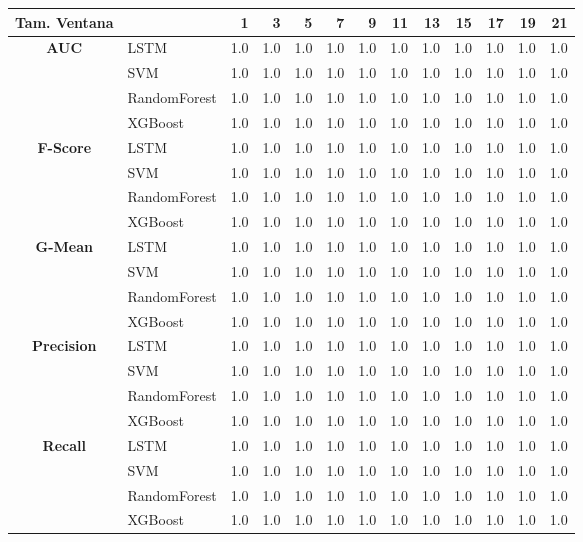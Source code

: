 \begin{table}[h]
	\centering
	\begin{adjustbox}{max width=11cm}
		
		\begin{tabular}{|c|l|r|r|r|r|r|r|r|r|r|r|r|}
			\hline
			\textbf{Tam. Ventana}&         &   1  &   3  &   5  &   7  &   9  &   11 &   13 &   15 &   17 &   19 &   21 \\
			\hline
			\textbf{AUC} & LSTM &  1.0 &  1.0 &  1.0 &  1.0 &  1.0 &  1.0 &  1.0 &  1.0 &  1.0 &  1.0 &  1.0 \\
			& SVM &  1.0 &  1.0 &  1.0 &  1.0 &  1.0 &  1.0 &  1.0 &  1.0 &  1.0 &  1.0 &  1.0 \\
			& RandomForest &  1.0 &  1.0 &  1.0 &  1.0 &  1.0 &  1.0 &  1.0 &  1.0 &  1.0 &  1.0 &  1.0 \\
			& XGBoost &  1.0 &  1.0 &  1.0 &  1.0 &  1.0 &  1.0 &  1.0 &  1.0 &  1.0 &  1.0 &  1.0 \\
			\hline
			\textbf{F-Score} & LSTM &  1.0 &  1.0 &  1.0 &  1.0 &  1.0 &  1.0 &  1.0 &  1.0 &  1.0 &  1.0 &  1.0 \\
			& SVM &  1.0 &  1.0 &  1.0 &  1.0 &  1.0 &  1.0 &  1.0 &  1.0 &  1.0 &  1.0 &  1.0 \\
			& RandomForest &  1.0 &  1.0 &  1.0 &  1.0 &  1.0 &  1.0 &  1.0 &  1.0 &  1.0 &  1.0 &  1.0 \\
			& XGBoost &  1.0 &  1.0 &  1.0 &  1.0 &  1.0 &  1.0 &  1.0 &  1.0 &  1.0 &  1.0 &  1.0 \\
			\hline
			\textbf{G-Mean} & LSTM &  1.0 &  1.0 &  1.0 &  1.0 &  1.0 &  1.0 &  1.0 &  1.0 &  1.0 &  1.0 &  1.0 \\
			& SVM &  1.0 &  1.0 &  1.0 &  1.0 &  1.0 &  1.0 &  1.0 &  1.0 &  1.0 &  1.0 &  1.0 \\
			& RandomForest &  1.0 &  1.0 &  1.0 &  1.0 &  1.0 &  1.0 &  1.0 &  1.0 &  1.0 &  1.0 &  1.0 \\
			& XGBoost &  1.0 &  1.0 &  1.0 &  1.0 &  1.0 &  1.0 &  1.0 &  1.0 &  1.0 &  1.0 &  1.0 \\
			\hline
			\textbf{Precision} & LSTM &  1.0 &  1.0 &  1.0 &  1.0 &  1.0 &  1.0 &  1.0 &  1.0 &  1.0 &  1.0 &  1.0 \\
			& SVM &  1.0 &  1.0 &  1.0 &  1.0 &  1.0 &  1.0 &  1.0 &  1.0 &  1.0 &  1.0 &  1.0 \\
			& RandomForest &  1.0 &  1.0 &  1.0 &  1.0 &  1.0 &  1.0 &  1.0 &  1.0 &  1.0 &  1.0 &  1.0 \\
			& XGBoost &  1.0 &  1.0 &  1.0 &  1.0 &  1.0 &  1.0 &  1.0 &  1.0 &  1.0 &  1.0 &  1.0 \\
			\hline
			\textbf{Recall} & LSTM &  1.0 &  1.0 &  1.0 &  1.0 &  1.0 &  1.0 &  1.0 &  1.0 &  1.0 &  1.0 &  1.0 \\
			& SVM &  1.0 &  1.0 &  1.0 &  1.0 &  1.0 &  1.0 &  1.0 &  1.0 &  1.0 &  1.0 &  1.0 \\
			& RandomForest &  1.0 &  1.0 &  1.0 &  1.0 &  1.0 &  1.0 &  1.0 &  1.0 &  1.0 &  1.0 &  1.0 \\
			& XGBoost &  1.0 &  1.0 &  1.0 &  1.0 &  1.0 &  1.0 &  1.0 &  1.0 &  1.0 &  1.0 &  1.0 \\
			\hline
			

\end{tabular}
\end{adjustbox}
\end{table}
